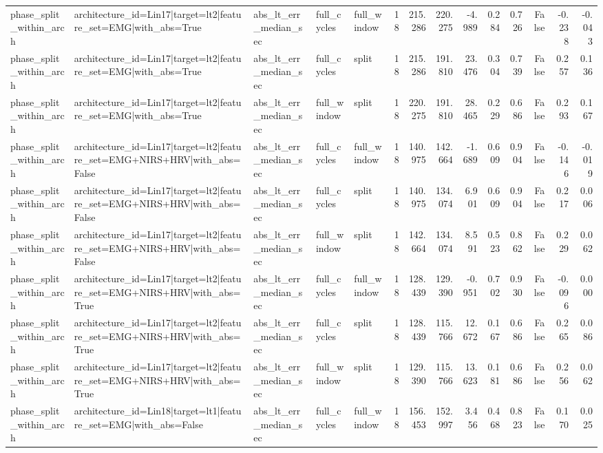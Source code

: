 \begin{table}
\begin{tabular}{lllllrrrrrrrrr}
phase_split_within_arch & architecture_id=Lin17|target=lt2|feature_set=EMG|with_abs=True & abs_lt_err_median_sec & full_cycles & full_window & 18 & 215.286 & 220.275 & -4.989 & 0.284 & 0.726 & False & -0.238 & -0.043 \\
phase_split_within_arch & architecture_id=Lin17|target=lt2|feature_set=EMG|with_abs=True & abs_lt_err_median_sec & full_cycles & split & 18 & 215.286 & 191.810 & 23.476 & 0.304 & 0.739 & False & 0.257 & 0.136 \\
phase_split_within_arch & architecture_id=Lin17|target=lt2|feature_set=EMG|with_abs=True & abs_lt_err_median_sec & full_window & split & 18 & 220.275 & 191.810 & 28.465 & 0.229 & 0.686 & False & 0.293 & 0.167 \\
phase_split_within_arch & architecture_id=Lin17|target=lt2|feature_set=EMG+NIRS+HRV|with_abs=False & abs_lt_err_median_sec & full_cycles & full_window & 18 & 140.975 & 142.664 & -1.689 & 0.609 & 0.904 & False & -0.146 & -0.019 \\
phase_split_within_arch & architecture_id=Lin17|target=lt2|feature_set=EMG+NIRS+HRV|with_abs=False & abs_lt_err_median_sec & full_cycles & split & 18 & 140.975 & 134.074 & 6.901 & 0.609 & 0.904 & False & 0.217 & 0.006 \\
phase_split_within_arch & architecture_id=Lin17|target=lt2|feature_set=EMG+NIRS+HRV|with_abs=False & abs_lt_err_median_sec & full_window & split & 18 & 142.664 & 134.074 & 8.591 & 0.523 & 0.862 & False & 0.229 & 0.062 \\
phase_split_within_arch & architecture_id=Lin17|target=lt2|feature_set=EMG+NIRS+HRV|with_abs=True & abs_lt_err_median_sec & full_cycles & full_window & 18 & 128.439 & 129.390 & -0.951 & 0.702 & 0.930 & False & -0.096 & 0.000 \\
phase_split_within_arch & architecture_id=Lin17|target=lt2|feature_set=EMG+NIRS+HRV|with_abs=True & abs_lt_err_median_sec & full_cycles & split & 18 & 128.439 & 115.766 & 12.672 & 0.167 & 0.686 & False & 0.265 & 0.086 \\
phase_split_within_arch & architecture_id=Lin17|target=lt2|feature_set=EMG+NIRS+HRV|with_abs=True & abs_lt_err_median_sec & full_window & split & 18 & 129.390 & 115.766 & 13.623 & 0.181 & 0.686 & False & 0.256 & 0.062 \\
phase_split_within_arch & architecture_id=Lin18|target=lt1|feature_set=EMG|with_abs=False & abs_lt_err_median_sec & full_cycles & full_window & 18 & 156.453 & 152.997 & 3.456 & 0.468 & 0.823 & False & 0.170 & 0.025 \\

\end{tabular}
\end{table}
